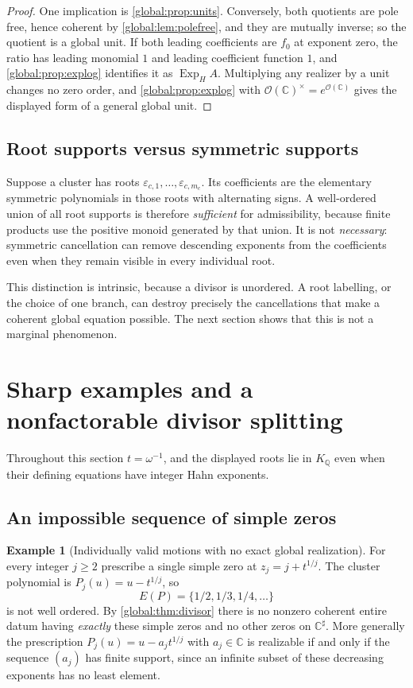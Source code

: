 \documentclass[11pt,letterpaper]{article}
\theoremstyle{definition}
\newtheorem{example}[example]{Example}
\theoremstyle{remark}
\newcommand{\C}{\mathbb C}
\newcommand{\Q}{\mathbb Q}
\newcommand{\OO}{\mathcal O}
\newcommand{\sh}{^{\sharp}}
\newcommand{\ExpH}{\operatorname{Exp}_{H}}
\numberwithin{equation}{section}
\begin{document}
\begin{proof}
One implication is \cref{global:prop:units}. Conversely, both quotients are pole free, hence coherent by \cref{global:lem:polefree}, and they are mutually inverse; so the quotient is a global unit. If both leading coefficients are $f_0$ at exponent zero, the ratio has leading monomial $1$ and leading coefficient function $1$, and \cref{global:prop:explog} identifies it as $\ExpH A$. Multiplying any realizer by a unit changes no zero order, and \cref{global:prop:explog} with $\OO(\C)^\times=e^{\OO(\C)}$ gives the displayed form of a general global unit.
\end{proof}

\subsection{Root supports versus symmetric supports}

Suppose a cluster has roots $\varepsilon_{c,1},\dots,\varepsilon_{c,m_c}$. Its coefficients are the elementary symmetric polynomials in those roots with alternating signs. A well-ordered union of all root supports is therefore \emph{sufficient} for admissibility, because finite products use the positive monoid generated by that union. It is not \emph{necessary}: symmetric cancellation can remove descending exponents from the coefficients even when they remain visible in every individual root.

This distinction is intrinsic, because a divisor is unordered. A root labelling, or the choice of one branch, can destroy precisely the cancellations that make a coherent global equation possible. The next section shows that this is not a marginal phenomenon.

\section{Sharp examples and a nonfactorable divisor splitting}\label{global:sec:examples}

Throughout this section $t=\omega^{-1}$, and the displayed roots lie in $K_\Q$ even when their defining equations have integer Hahn exponents.

\subsection{An impossible sequence of simple zeros}

\begin{example}[Individually valid motions with no exact global realization]\label{global:ex:simple}
For every integer $j\ge2$ prescribe a single simple zero at $z_j=j+t^{1/j}$. The cluster polynomial is $P_j(u)=u-t^{1/j}$, so
\[
  E(P)=\{1/2,1/3,1/4,\dots\}
\]
is not well ordered. By \cref{global:thm:divisor} there is no nonzero coherent entire datum having \emph{exactly} these simple zeros and no other zeros on $\C\sh$. More generally the prescription $P_j(u)=u-a_jt^{1/j}$ with $a_j\in\C$ is realizable if and only if the sequence $(a_j)$ has finite support, since an infinite subset of these decreasing exponents has no least element.
\end{example}
\end{document}
